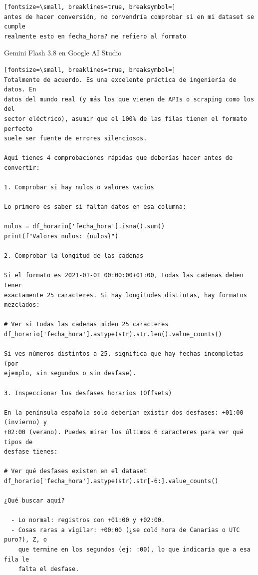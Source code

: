 \documentclass[12pt,a4paper,oneside]{book}
\begin{document}
\begin{iaprompt}
\begin{Verbatim}[fontsize=\small, breaklines=true, breaksymbol=]
antes de hacer conversión, no convendría comprobar si en mi dataset se cumple
realmente esto en fecha_hora? me refiero al formato

\end{Verbatim}
\end{iaprompt}
\begin{iaresp}{Gemini Flash 3.8 en Google AI Studio}
\begin{Verbatim}[fontsize=\small, breaklines=true, breaksymbol=]
Totalmente de acuerdo. Es una excelente práctica de ingeniería de datos. En
datos del mundo real (y más los que vienen de APIs o scraping como los del
sector eléctrico), asumir que el 100% de las filas tienen el formato perfecto
suele ser fuente de errores silenciosos.

Aquí tienes 4 comprobaciones rápidas que deberías hacer antes de convertir:

1. Comprobar si hay nulos o valores vacíos

Lo primero es saber si faltan datos en esa columna:

nulos = df_horario['fecha_hora'].isna().sum()
print(f"Valores nulos: {nulos}")

2. Comprobar la longitud de las cadenas

Si el formato es 2021-01-01 00:00:00+01:00, todas las cadenas deben tener
exactamente 25 caracteres. Si hay longitudes distintas, hay formatos mezclados:

# Ver si todas las cadenas miden 25 caracteres
df_horario['fecha_hora'].astype(str).str.len().value_counts()

Si ves números distintos a 25, significa que hay fechas incompletas (por
ejemplo, sin segundos o sin desfase).

3. Inspeccionar los desfases horarios (Offsets)

En la península española solo deberían existir dos desfases: +01:00 (invierno) y
+02:00 (verano). Puedes mirar los últimos 6 caracteres para ver qué tipos de
desfase tienes:

# Ver qué desfases existen en el dataset
df_horario['fecha_hora'].astype(str).str[-6:].value_counts()

¿Qué buscar aquí?

  - Lo normal: registros con +01:00 y +02:00.
  - Cosas raras a vigilar: +00:00 (¿se coló hora de Canarias o UTC puro?), Z, o
    que termine en los segundos (ej: :00), lo que indicaría que a esa fila le
    falta el desfase.


\end{Verbatim}
\end{iaresp}
\end{document}
